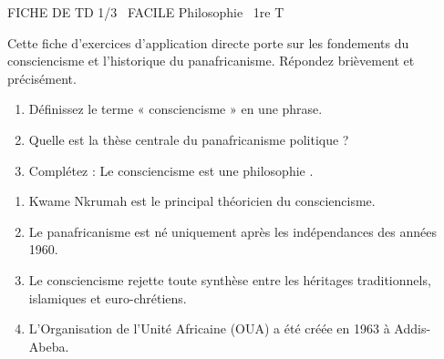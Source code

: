 \documentclass[11pt]{article}
\begin{document}
\begin{tcolorbox}[enhanced,colback=popink,colframe=popink,arc=10pt,boxrule=0pt,left=12pt,right=12pt,top=9pt,bottom=9pt]
{\color{white}\popxbold\small FICHE DE TD 1/3 \textbullet\ FACILE \hfill Philosophie \textbullet\ 1re T\par}
\end{tcolorbox}
\vspace{4pt}
Cette fiche d'exercices d'application directe porte sur les fondements du consciencisme et l'historique du panafricanisme. Répondez brièvement et précisément.

\begin{exercice}
\begin{enumerate}
    \item Définissez le terme « consciencisme » en une phrase.
    \item Quelle est la thèse centrale du panafricanisme politique ?
    \item Complétez : Le consciencisme est une philosophie \underline{\hspace{4cm}}.
\end{enumerate}
\end{exercice}

\begin{exercice}
\begin{enumerate}
    \item Kwame Nkrumah est le principal théoricien du consciencisme.
    \item Le panafricanisme est né uniquement après les indépendances des années 1960.
    \item Le consciencisme rejette toute synthèse entre les héritages traditionnels, islamiques et euro-chrétiens.
    \item L'Organisation de l'Unité Africaine (OUA) a été créée en 1963 à Addis-Abeba.
\end{enumerate}
\end{exercice}
\end{document}
